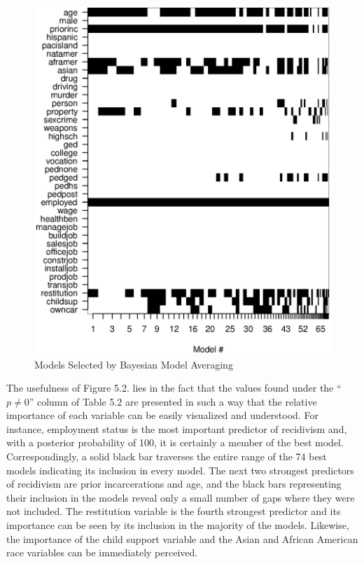 \begin{figure}[t]
\begin{center}
\includegraphics[clip=true,viewport=0mm 0mm 168mm 180mm, scale=0.85]{graph521.eps}
\caption{Models Selected by Bayesian Model Averaging}
\end{center}
\end{figure}

The usefulness of Figure 5.2. lies in the fact that the values found under the ``$p\neq 0$'' column of Table 5.2 are presented in such a way that the relative importance of each variable can be easily visualized and understood.  For instance, employment status is the most important predictor of recidivism and, with a posterior probability of 100, it is certainly a member of the best model.  Correspondingly, a solid black bar traverses the entire range of the 74 best models indicating its inclusion in every model.  The next two strongest predictors of recidivism are prior incarcerations and age, and the black bars representing their inclusion in the models reveal only a small number of gaps where they were not included.  The restitution variable is the fourth strongest predictor and its importance can be seen by its inclusion in the majority of the models.  Likewise, the importance of the child support variable and the Asian and African American race variables can be immediately perceived.

